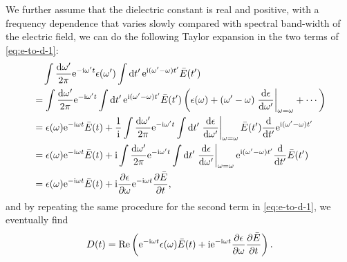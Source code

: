 \documentclass[hyperref, a4paper]{article}
\newcommand*{\ii}{\mathrm{i}}
\newcommand*{\ee}{\mathrm{e}}
\begin{document}
We further assume that the dielectric constant is real and positive, 
with a frequency dependence that varies slowly 
compared with spectral band-width of the electric field,
we can do the following Taylor expansion 
in the two terms of \eqref{eq:e-to-d-1}:
\begin{equation}
    \begin{aligned}
        &\quad \int \frac{\dd{\omega'}}{2\pi} \ee^{- \ii \omega' t} \epsilon(\omega') 
        \int \dd{t'} \ee^{\ii (\omega' - \omega) t'} \bar{E}(t') \\
        &= \int \frac{\dd{\omega'}}{2\pi} \ee^{- \ii \omega' t} 
        \int \dd{t'} \ee^{\ii (\omega' - \omega) t'} \bar{E}(t')  \left(
            \epsilon(\omega) + 
            (\omega' - \omega) \eval{\dv{\epsilon}{\omega'}}_{\omega = \omega}
            + \cdots 
        \right) \\
        &= \epsilon(\omega) \ee^{- \ii \omega t} \bar{E}(t) 
        + \frac{1}{\ii} \int \frac{\dd{\omega'}}{2\pi} \ee^{- \ii \omega' t} \int \dd{t'} 
        \eval{\dv{\epsilon}{\omega'}}_{\omega = \omega} \bar{E}(t') 
        \dv{t'} \ee^{\ii (\omega' - \omega) t'} \\
        &= \epsilon(\omega) \ee^{- \ii \omega t} \bar{E}(t) 
        + \ii \int \frac{\dd{\omega'}}{2\pi} \ee^{- \ii \omega' t} \int \dd{t'} 
        \eval{\dv{\epsilon}{\omega'}}_{\omega = \omega} 
        \ee^{\ii (\omega' - \omega) t'}
        \dv{t'} \bar{E}(t')  \\
        &= \epsilon(\omega) \ee^{- \ii \omega t} \bar{E}(t) 
        + \ii \pdv{\epsilon}{\omega} \ee^{- \ii \omega t} \pdv{\bar{E}}{t},
    \end{aligned}
    \label{eq:pdv-d-t-derivation}
\end{equation}
and by repeating the same procedure for the second term in \eqref{eq:e-to-d-1},
we eventually find 
\begin{equation}
    D(t) = \Re \left(
        \ee^{- \ii \omega t} \epsilon(\omega) \bar{E}(t) 
        + \ii \ee^{- \ii \omega t} \pdv{\epsilon}{\omega}  \pdv{\bar{E}}{t}
    \right).
    \label{eq:d-final}
\end{equation}
\end{document}
